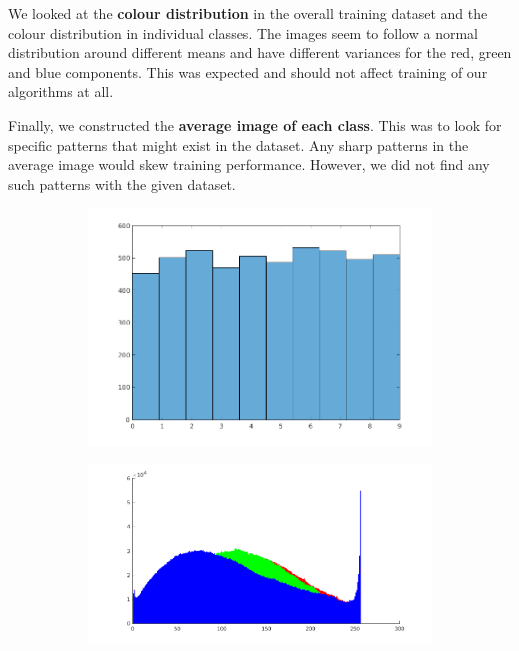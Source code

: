 \documentclass{article} %
\begin{document}
    We looked at the \textbf{colour distribution} in the overall training dataset and the colour distribution in individual classes. The images seem to follow a normal distribution around different means and have different variances for the red, green and blue components. This was expected and should not affect training of our algorithms at all.

    Finally, we constructed the \textbf{average image of each class}. This was to look for specific patterns that might exist in the dataset. Any sharp patterns in the average image would skew training performance. However, we did not find any such patterns with the given dataset.

    \begin{figure}
        \centering
        \begin{subfigure}{.24\linewidth}
            \centering
            \includegraphics[width=\linewidth]{images/label-distribution.png}
        \caption{}
        \end{subfigure}
        \begin{subfigure}{.24\linewidth}
            \centering
            \includegraphics[width=\linewidth]{images/hist-overall.png}

\end{subfigure}
\end{figure}
\end{document}
